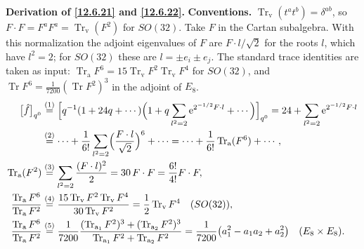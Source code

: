 \begin{tcolorbox}[breakable]
	\begin{remark}
		\textbf{Derivation of \eqref{12.6.21} and \eqref{12.6.22}.} \textbf{Conventions.} $\operatorname{Tr}_{\mathrm v}(t^{a}t^{b})=\delta^{ab}$, so $F\cdot F=F^{a}F^{a}=\operatorname{Tr}_{\mathrm v}(F^{2})$ for $SO(32)$. Take $F$ in the Cartan subalgebra. With this normalization the adjoint eigenvalues of $F$ are $F\cdot l/\sqrt2$ for the roots $l$, which have $l^{2}=2$; for $SO(32)$ these are $l=\pm e_{i}\pm e_{j}$. The standard trace identities are taken as input: $\operatorname{Tr}_{\mathrm a}F^{6}=15\operatorname{Tr}_{\mathrm v}F^{2}\operatorname{Tr}_{\mathrm v}F^{4}$ for $SO(32)$, and $\operatorname{Tr}F^{6}=\frac{1}{7200}(\operatorname{Tr}F^{2})^{3}$ in the adjoint of $E_{8}$.
		\begin{align*}
			\bigl[\hat f\bigr]_{q^{0}}&\overset{(1)}{=} \Bigl[q^{-1}(1+24q+\cdots)\Bigl(1+q\sum_{l^{2}=2}\mathrm{e}^{2^{-1/2}F\cdot l}+\cdots\Bigr)\Bigr]_{q^{0}}
			=24+\sum_{l^{2}=2}\mathrm{e}^{2^{-1/2}F\cdot l}\\
			&\overset{(2)}{=} \cdots+\frac{1}{6!}\sum_{l^{2}=2}\Bigl(\frac{F\cdot l}{\sqrt2}\Bigr)^{6}+\cdots=\cdots+\frac{1}{6!}\operatorname{Tr}_{\mathrm a}(F^{6})+\cdots ,\\
			\operatorname{Tr}_{\mathrm a}(F^{2})&\overset{(3)}{=} \sum_{l^{2}=2}\frac{(F\cdot l)^{2}}{2}=30\,F\cdot F=\frac{6!}{4!}F\cdot F ,\\
			\frac{\operatorname{Tr}_{\mathrm a}F^{6}}{\operatorname{Tr}_{\mathrm a}F^{2}}&\overset{(4)}{=} \frac{15\operatorname{Tr}_{\mathrm v}F^{2}\operatorname{Tr}_{\mathrm v}F^{4}}{30\operatorname{Tr}_{\mathrm v}F^{2}}=\frac12\operatorname{Tr}_{\mathrm v}F^{4}\quad(SO(32)),\\
			\frac{\operatorname{Tr}_{\mathrm a}F^{6}}{\operatorname{Tr}_{\mathrm a}F^{2}}&\overset{(5)}{=} \frac{1}{7200}\frac{(\operatorname{Tr}_{\mathrm a_1}F^{2})^{3}+(\operatorname{Tr}_{\mathrm a_2}F^{2})^{3}}{\operatorname{Tr}_{\mathrm a_1}F^{2}+\operatorname{Tr}_{\mathrm a_2}F^{2}}
			=\frac{1}{7200}\bigl(a_{1}^{2}-a_{1}a_{2}+a_{2}^{2}\bigr)\quad(E_{8}\times E_{8}) .
		\end{align*}

\end{remark}
\end{tcolorbox}

